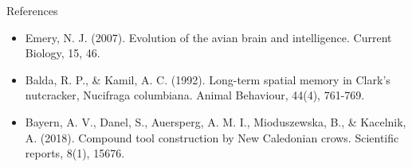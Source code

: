 \documentclass[
  11pt,
  ignorenonframetext,
]{beamer}
\begin{document}
\begin{frame}{References}
\label{references-3}
\begin{itemize}
\item
  Emery, N. J. (2007). Evolution of the avian brain and intelligence.
  Current Biology, 15, 46.
\item
  Balda, R. P., \& Kamil, A. C. (1992). Long-term spatial memory in
  Clark's nutcracker, Nucifraga columbiana. Animal Behaviour, 44(4),
  761-769.
\item
  Bayern, A. V., Danel, S., Auersperg, A. M. I., Mioduszewska, B., \&
  Kacelnik, A. (2018). Compound tool construction by New Caledonian
  crows. Scientific reports, 8(1), 15676.
\end{itemize}
\end{frame}
\end{document}
